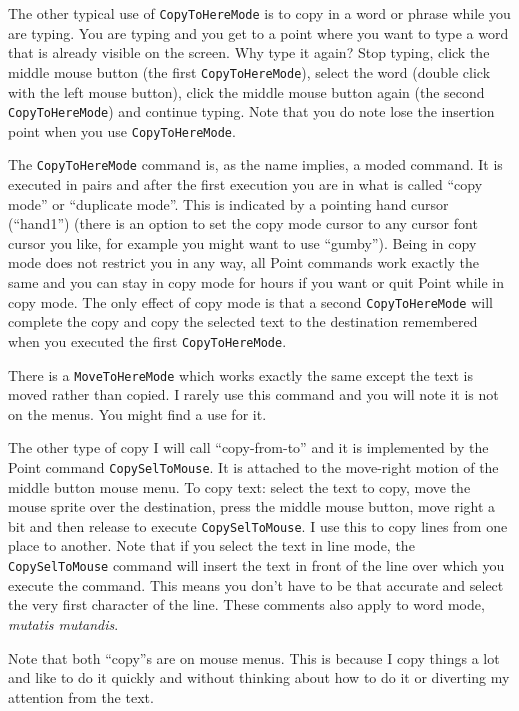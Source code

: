 The other typical use of {\tt CopyToHereMode} is to copy in a word
or phrase while you are typing.
You are typing and you get to a point where you want to type a word that
is already visible on the screen.
Why type it again?
Stop typing, click the middle mouse button (the first {\tt CopyToHereMode}),
select the word (double click with the left mouse button), click
the middle mouse button again (the second {\tt CopyToHereMode})
and continue typing.
Note that you do note lose the insertion point when you use
{\tt CopyToHereMode}.

The {\tt CopyToHereMode} command is, as the name implies,
a moded command.
It is executed in pairs and after the first execution you are in
what is called ``copy mode'' or ``duplicate mode''.
This is indicated by a pointing hand cursor (``hand1'')
(there is an option to
set the copy mode cursor to any cursor font cursor you like,
for example you might want to use ``gumby'').
Being in copy mode does not restrict you in any way,
all Point commands work exactly the same and you can stay
in copy mode for hours if you want or quit Point while in
copy mode.
The only effect of copy mode is that a second {\tt CopyToHereMode}
will complete the copy and copy the selected text to the destination
remembered when you executed the first {\tt CopyToHereMode}.

There is a {\tt MoveToHereMode} which works exactly the same
except the text is moved rather than copied.
I rarely use this command and you will note it is not
on the menus.
You might find a use for it.

The other type of copy I will call ``copy-from-to'' and it is
implemented by the Point command {\tt CopySelToMouse}.
It is attached to the move-right motion of the middle button
mouse menu.
To copy text: select the text to copy,
move the mouse sprite over the destination,
press the middle mouse button, move right a bit and then release
to execute {\tt CopySelToMouse}.
I use this to copy lines from one place to another.
Note that if you select the text in line mode,
the {\tt CopySelToMouse} command will insert the text in front of
the line over which you execute the command.
This means you don't have to be that accurate and select the very
first character of the line.
These comments also apply to word mode, {\it mutatis mutandis}.

Note that both ``copy''s are on mouse menus.
This is because I copy things a lot and like to do it quickly
and without thinking about how to do it
or diverting my attention from the text.

